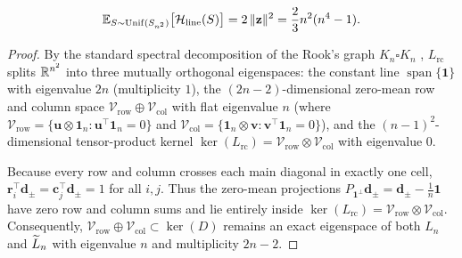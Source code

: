 \begin{proposition}
\begin{equation}
  \mathbb{E}_{S\sim\operatorname{Unif}(S_{n^2})}\bigl[\mathcal{H}_{\mathrm{line}}(S)\bigr] = 2\,\|\mathbf{z}\|^2 = \frac{2}{3}n^2(n^4 - 1).
  \label{eq:ensemble_mean_H}
\end{equation}
\end{proposition}

\begin{proof}
By the standard spectral decomposition of the Rook's graph $K_n \square K_n$ \cite{godsil2001algebraic,brouwer2012spectra}, $L_{\mathrm{rc}}$ splits $\mathbb{R}^{n^2}$ into three mutually orthogonal eigenspaces: the constant line $\operatorname{span}\{\mathbf{1}\}$ with eigenvalue $2n$ (multiplicity $1$), the $(2n-2)$-dimensional zero-mean row and column space $\mathcal{V}_{\mathrm{row}} \oplus \mathcal{V}_{\mathrm{col}}$ with flat eigenvalue $n$ (where $\mathcal{V}_{\mathrm{row}} = \{\mathbf{u}\otimes \mathbf{1}_n : \mathbf{u}^\top \mathbf{1}_n = 0\}$ and $\mathcal{V}_{\mathrm{col}} = \{\mathbf{1}_n \otimes \mathbf{v} : \mathbf{v}^\top \mathbf{1}_n = 0\}$), and the $(n-1)^2$-dimensional tensor-product kernel $\ker(L_{\mathrm{rc}}) = \mathcal{V}_{\mathrm{row}}\otimes \mathcal{V}_{\mathrm{col}}$ with eigenvalue $0$.

Because every row and column crosses each main diagonal in exactly one cell, $\mathbf{r}_i^\top \mathbf{d}_\pm = \mathbf{c}_j^\top \mathbf{d}_\pm = 1$ for all $i,j$. Thus the zero-mean projections $P_{\mathbf{1}^\perp}\mathbf{d}_\pm = \mathbf{d}_\pm - \frac{1}{n}\mathbf{1}$ have zero row and column sums and lie entirely inside $\ker(L_{\mathrm{rc}}) = \mathcal{V}_{\mathrm{row}}\otimes \mathcal{V}_{\mathrm{col}}$. Consequently, $\mathcal{V}_{\mathrm{row}} \oplus \mathcal{V}_{\mathrm{col}} \subset \ker(D)$ remains an exact eigenspace of both $L_n$ and $\widetilde{L}_n$ with eigenvalue $n$ and multiplicity $2n-2$.


\end{proof}
